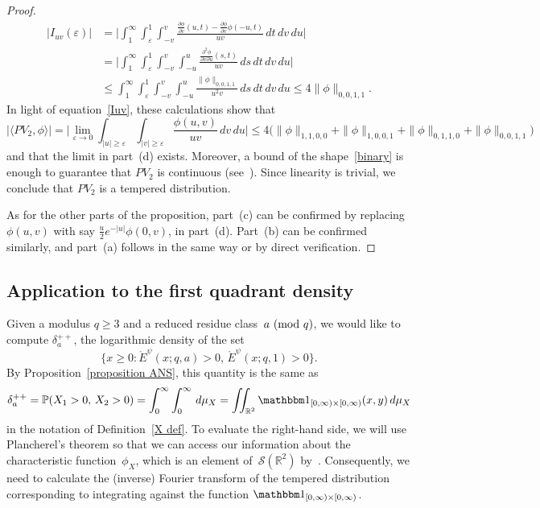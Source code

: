 \documentclass[11pt]{article}
\theoremstyle{plain}
\theoremstyle{definition}
\numberwithin{equation}{section}
\renewcommand{\mod}[1]{{\ifmmode\text{\rm\ (mod~$#1$)}\else\discretionary{}{}{\hbox{\!\!}}\rm(mod~$#1$)\fi}}
\newcommand{\Edot}{\mathord{\mathring E}}
\newcommand{\R}{\mathbb R}
\newcommand{\0}{{\vec 0}}
\begin{document}
\begin{proof}
\begin{align*}
|I_{uv}(\varepsilon)| &= \biggl| \int_1^\infty \int_\varepsilon^1 \int_{-v}^v \frac{\frac{\partial \phi}{\partial v}(u,t) - \frac{\partial \phi}{\partial v}\phi(-u,t)}{uv} \,dt\,dv\,du \biggr| \\
&= \biggl| \int_1^\infty \int_\varepsilon^1 \int_{-v}^v \int_{-u}^u \frac{\frac{\partial^2 \phi}{\partial v\partial u}(s,t)}{uv} \,ds\,dt\,dv\,du \biggr| \\
&\le \int_1^\infty \int_\varepsilon^1 \int_{-v}^v \int_{-u}^u \frac{\|\phi\|_{0,0,1,1}}{u^2v} \,ds\,dt\,dv\,du \le 4\|\phi\|_{0,0,1,1}.
\end{align*}
In light of equation~\eqref{Iuv}, these calculations show that
\begin{equation} \label{binary}
\bigl| \langle PV_2,\phi \rangle \bigr| = \biggl| \lim_{\varepsilon\rightarrow 0} \int_{|u|\ge \varepsilon}\int_{|v|\ge \varepsilon}\frac{\phi(u,v)}{uv}\,dv\,du \biggr| \le 4 \bigl( \|\phi\|_{1,1,0,0} + \|\phi\|_{1,0,0,1} + \|\phi\|_{0,1,1,0} + \|\phi\|_{0,0,1,1} \bigr)
\end{equation}
and that the limit in part~(d) exists. Moreover, a bound of the shape~\eqref{binary} is enough to guarantee that $PV_2$ is continuous (see~\cite[page~134]{ReedSimon}). Since linearity is trivial, we conclude that $PV_2$ is a tempered distribution.

As for the other parts of the proposition, part~(c) can be confirmed by replacing $\phi(u,v)$ with say $\frac u2 e^{-|u|} \phi(0,v)$, in part~(d). Part~(b) can be confirmed similarly, and part~(a) follows in the same way or by direct verification.
\end{proof}


\subsection{Application to the first quadrant density}

Given a modulus $q\ge3$ and a reduced residue class~$a\mod q$, we would like to compute $\delta^{++}_a$, the logarithmic density of the set 
\[
\{x\ge0\colon \Edot^\psi(x;q,a) > 0,\, \Edot^\psi(x;q,1) > 0 \}.
\]
By Proposition~\ref{proposition ANS}, this quantity is the same as
\begin{equation} \label{Heaviside2}
\delta^{++}_a = \mathbb{P}(X_1>0,\,X_2>0) = \int_0^{\infty}\int_0^{\infty} \,d\mu_{X} = \iint_{\mathbb{R}^2}\mathbbm1_{[0,\infty)\times[0,\infty)}(x,y) \,d\mu_{X}
\end{equation}
in the notation of Definition~\ref{X def}. To evaluate the right-hand side, we will use Plancherel's theorem so that we can access our information about the characteristic function~$\phi_X$, which is an element of~$\mathcal{S}(\R^2)$ by~\cite[Lemma 2.2]{BSRPNR}. Consequently, we need to calculate the (inverse) Fourier transform of the tempered distribution corresponding to integrating against the function $\mathbbm1_{[0,\infty)\times[0,\infty)}$.
\end{document}
